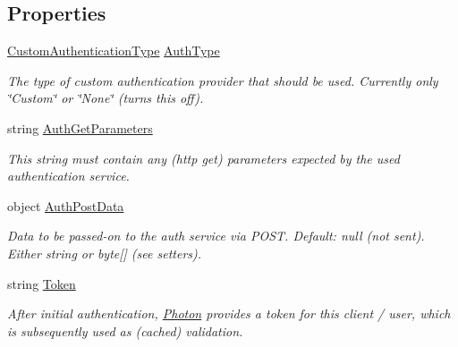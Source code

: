 \subsection*{Properties}
\begin{DoxyCompactItemize}
\item 
\hyperlink{namespace_exit_games_1_1_client_1_1_photon_1_1_chat_aef14e10728bdf2b99b2a7e6fd4ac4a1c}{Custom\+Authentication\+Type} \hyperlink{class_exit_games_1_1_client_1_1_photon_1_1_chat_1_1_authentication_values_a8736f9ea3a807749dfe4bdbab4d4ff5a}{Auth\+Type}
\begin{DoxyCompactList}\small\item\em The type of custom authentication provider that should be used. Currently only \char`\"{}\+Custom\char`\"{} or \char`\"{}\+None\char`\"{} (turns this off).\end{DoxyCompactList}\item 
string \hyperlink{class_exit_games_1_1_client_1_1_photon_1_1_chat_1_1_authentication_values_a62b771eb77744555663093db81de52ad}{Auth\+Get\+Parameters}
\begin{DoxyCompactList}\small\item\em This string must contain any (http get) parameters expected by the used authentication service. \end{DoxyCompactList}\item 
object \hyperlink{class_exit_games_1_1_client_1_1_photon_1_1_chat_1_1_authentication_values_a62980bf198ce9565c41d408a4df93310}{Auth\+Post\+Data}
\begin{DoxyCompactList}\small\item\em Data to be passed-\/on to the auth service via P\+O\+ST. Default\+: null (not sent). Either string or byte\mbox{[}\mbox{]} (see setters).\end{DoxyCompactList}\item 
string \hyperlink{class_exit_games_1_1_client_1_1_photon_1_1_chat_1_1_authentication_values_a400c002afb41d2ea2a2288e3d010afa6}{Token}
\begin{DoxyCompactList}\small\item\em After initial authentication, \hyperlink{namespace_exit_games_1_1_client_1_1_photon}{Photon} provides a token for this client / user, which is subsequently used as (cached) validation.\end{DoxyCompactList}\item 

\end{DoxyCompactItemize}

